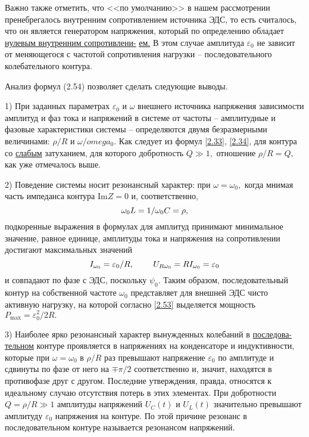 {Важно также отметить, что <<по умолчанию>> в нашем рассмотрении пренебрегалось внутренним сопротивлением источника ЭДС, то есть считалось, что он является \textsf{генератором напряжения,} который по определению обладает \underline{нулевым внутренним сопротивлени-} \underline{ем.} В этом случае амплитуда $\varepsilon_0$ не зависит от меняющегося с частотой сопротивления нагрузки – последовательного колебательного контура.

Анализ формул (2.54) позволяет сделать следующие выводы.

1) При заданных параметрах $\varepsilon_0$ и $\omega$ внешнего источника напряжения зависимости амплитуд и фаз тока и напряжений в системе от частоты – \textsf{амплитудные} и \textsf{фазовые характеристики системы} – определяются двумя безразмерными величинами: $\rho/R$ и $\omega/omega_0.$ Как следует из формул \eqref{2.33}, \eqref{2.34}, для контура со \underline{слабым} затуханием, для которого добротность $Q\gg1,$ отношение $\rho/R=Q,$ как уже отмечалось выше.

2) Поведение системы носит резонансный характер: при $\omega=\omega_0,$ когда мнимая часть импеданса контура $\text{Im}Z=0$ и, соответственно,
\setcounter{equation}{54}
\begin{equation}\eqmark{2.55}
	\omega_0L=1/\omega_0C=\rho,
\end{equation}
подкоренные выражения в формулах для амплитуд принимают минимальное значение, равное единице, амплитуды тока и напряжения на сопротивлении достигают максимальных значений
\begin{equation}\eqmark{2.56}
	I_{\omega_0}=\varepsilon_0/R,~~~~~~~U_{R\omega_0}=RI_{\omega_0}=\varepsilon_0
\end{equation}
и совпадают по фазе с ЭДС, поскольку $\psi_0.$ Таким образом, последовательный контур на собственной частоте $\omega_0$ представляет для внешней ЭДС чисто активную нагрузку, на которой согласно \eqref{2.53} выделяется мощность $P_{\text{max}}=\varepsilon_0^2/2R.$

3) Наиболее ярко резонансный характер вынужденных колебаний в \underline{последова-} \underline{тельном} контуре проявляется в напряжениях на конденсаторе и индуктивности, которые при $\omega=\omega_0$ в $\rho/R$ раз превышают напряжение $\varepsilon_0$ по амплитуде и сдвинуты по фазе от него на $\mp\pi/2$ соответственно и, значит, находятся в противофазе друг с другом. Последние утверждения, правда, относятся к идеальному случаю отсутствия потерь в этих элементах. При добротности $Q=\rho/R\gg1$ амплитуды напряжений $U_C(t)$ и $U_L(t)$ значительно превышают амплитуду $\varepsilon_0$ напряжения на контуре. По этой причине резонанс в последовательном контуре называется \textsf{резонансом напряжений.}

}
